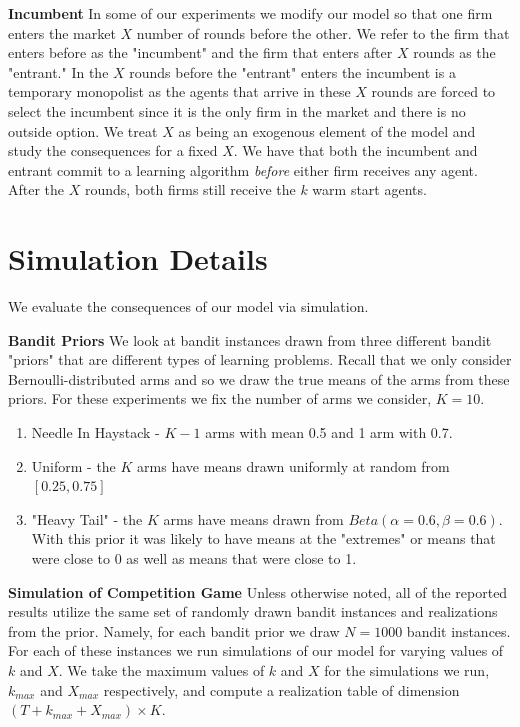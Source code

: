 \documentclass{article}
\theoremstyle{definition}
\begin{document}
\noindent \textbf{Incumbent} In some of our experiments we modify our model so that one firm enters the market $X$ number of rounds before the other. We refer to the firm that enters before as the "incumbent" and the firm that enters after $X$ rounds as the "entrant." In the $X$ rounds before the "entrant" enters the incumbent is a temporary monopolist as the agents that arrive in these $X$ rounds are forced to select the incumbent since it is the only firm in the market and there is no outside option. We treat $X$ as being an exogenous element of the model and study the consequences for a fixed $X$. We have that both the incumbent and entrant commit to a learning algorithm \textit{before} either firm receives any agent. After the $X$ rounds, both firms still receive the $k$ warm start agents.

\section{Simulation Details}\label{section:3}

We evaluate the consequences of our model via simulation.

\textbf{Bandit Priors} We look at bandit instances drawn from three different bandit "priors" that are different types of learning problems. Recall that we only consider Bernoulli-distributed arms and so we draw the true means of the arms from these priors. For these experiments we fix the number of arms we consider, $K = 10$.
\begin{enumerate}
\item Needle In Haystack - $K-1$ arms with mean 0.5 and 1 arm with 0.7.
\item Uniform - the $K$ arms have means drawn uniformly at random from $[0.25, 0.75]$
\item "Heavy Tail" - the $K$ arms have means drawn from $Beta(\alpha=0.6, \beta = 0.6)$. With this prior it was likely to have means at the "extremes" or means that were close to 0 as well as means that were close to 1.
\end{enumerate} 

\noindent \textbf{Simulation of Competition Game} Unless otherwise noted, all of the reported results utilize the same set of randomly drawn bandit instances and realizations from the prior. Namely, for each bandit prior we draw $N = 1000$ bandit instances. For each of these instances we run simulations of our model for varying values of $k$ and $X$. We take the maximum values of $k$ and $X$ for the simulations we run, $k_{max}$ and $X_{max}$ respectively, and compute a realization table of dimension $(T+k_{max}+X_{max}) \times K$. 
\end{document}
